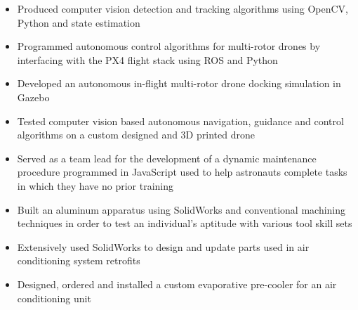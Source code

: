 \documentclass[10pt,ragged2e]{altacv}
\begin{document}

\begin{fullwidth}
  \makecvheader
\end{fullwidth}



\begin{itemize}
  \item Produced computer vision detection and tracking algorithms using OpenCV, Python and state estimation
  \item Programmed autonomous control algorithms for multi-rotor drones by interfacing with the PX4 flight stack using ROS and Python 
  \item Developed an autonomous in-flight multi-rotor drone docking simulation in Gazebo
  \item Tested computer vision based autonomous navigation, guidance and control algorithms on a custom designed and 3D printed drone
\end{itemize}

\begin{itemize}
  \item Served as a team lead for the development of a dynamic maintenance procedure programmed in JavaScript used to help astronauts complete tasks in which they have no prior training 
  \item Built an aluminum apparatus using SolidWorks and conventional machining techniques in order to test an individual’s aptitude with various tool skill sets
\end{itemize}

\divider

\begin{itemize}
  \item Extensively used SolidWorks to design and update parts used in air conditioning system retrofits
  \item Designed, ordered and installed a custom evaporative pre-cooler for an air conditioning unit
\end{itemize}
\end{document}
